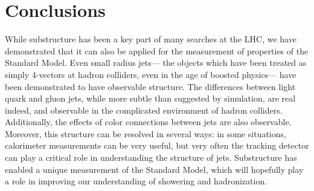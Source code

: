 


\section{Conclusions}

While substructure has been a key part of many searches at the LHC, we have demonstrated that it can also be applied for the measurement of properties of the Standard Model. Even small radius jets--- the objects which have been treated as simply 4-vectors at hadron colliders, even in the age of boosted physics--- have been demonstrated to have observable structure. The differences between light quark and gluon jets, while more subtle than suggested by simulation, are real indeed, and observable in the complicated environment of hadron colliders. Additionally, the effects of color connections between jets are also observable. Moreover, this structure can be resolved in several ways: in some situations, calorimeter measurements can be very useful, but very often the tracking detector can play a critical role in understanding the structure of jets. Substructure has enabled a unique measurement of the Standard Model, which will hopefully play a role in improving our understanding of showering and hadronization.
